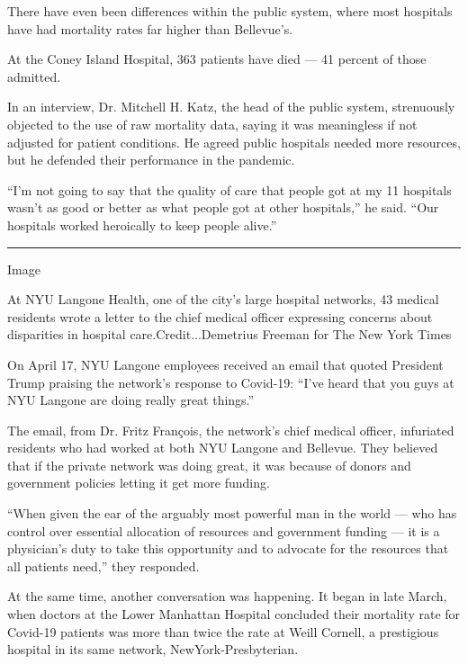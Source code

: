 There have even been differences within the public system, where most
hospitals have had mortality rates far higher than Bellevue's.

At the Coney Island Hospital, 363 patients have died --- 41 percent of
those admitted.

In an interview, Dr. Mitchell H. Katz, the head of the public system,
strenuously objected to the use of raw mortality data, saying it was
meaningless if not adjusted for patient conditions. He agreed public
hospitals needed more resources, but he defended their performance in
the pandemic.

``I'm not going to say that the quality of care that people got at my 11
hospitals wasn't as good or better as what people got at other
hospitals,'' he said. ``Our hospitals worked heroically to keep people
alive.''

\begin{center}\rule{0.5\linewidth}{\linethickness}\end{center}

Image

At NYU Langone Health, one of the city's large hospital networks, 43
medical residents wrote a letter to the chief medical officer expressing
concerns about disparities in hospital care.Credit...Demetrius Freeman
for The New York Times

On April 17, NYU Langone employees received an email that quoted
President Trump praising the network's response to Covid-19: ``I've
heard that you guys at NYU Langone are doing really great things.''

The email, from Dr. Fritz François, the network's chief medical officer,
infuriated residents who had worked at both NYU Langone and Bellevue.
They believed that if the private network was doing great, it was
because of donors and government policies letting it get more funding.

``When given the ear of the arguably most powerful man in the world ---
who has control over essential allocation of resources and government
funding --- it is a physician's duty to take this opportunity and to
advocate for the resources that all patients need,'' they responded.

At the same time, another conversation was happening. It began in late
March, when doctors at the Lower Manhattan Hospital concluded their
mortality rate for Covid-19 patients was more than twice the rate at
Weill Cornell, a prestigious hospital in its same network,
NewYork-Presbyterian.

